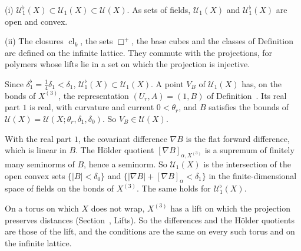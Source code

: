 \begin{detail}\label{d11b:gl-flatconf}
(i) $\mathcal U^\flat_1(X)\subset\mathcal U_1(X)\subset\mathcal U(X)$. As sets of fields, $\mathcal U_1(X)$ and $\mathcal U^\flat_1(X)$ are open and convex.

(ii) The closures $\operatorname{cl}_k$, the sets $\Box^+$, the base cubes and the classes of Definition~ are defined on the infinite lattice. They commute with the projections, for polymers whose lifts lie in a set on which the projection is injective.
\end{detail}

\begin{step}
Since $\delta_1^\flat=\frac14\delta_1<\delta_1$, $\mathcal U^\flat_1(X)\subset\mathcal U_1(X)$. A point $V_B$ of $\mathcal U_1(X)$ has, on the bonds of $X^{(3)}$, the representation $(U_r,A)=(1,B)$ of Definition~. Its real part $1$ is real, with curvature and current $0<\theta_r$, and $B$ satisfies the bounds of $\mathcal U(X)=\mathcal U(X;\theta_r,\delta_1,\delta_0)$. So $V_B\in\mathcal U(X)$.

With the real part $1$, the covariant difference $\nabla B$ is the flat forward difference, which is linear in $B$. The Hölder quotient $[\nabla B]_{\alpha,X^{(3)}}$ is a supremum of finitely many seminorms of $B$, hence a seminorm. So $\mathcal U_1(X)$ is the intersection of the open convex sets $\{|B|<\delta_0\}$ and $\{|\nabla B|+[\nabla B]_\alpha<\delta_1\}$ in the finite-dimensional space of fields on the bonds of $X^{(3)}$. The same holds for $\mathcal U^\flat_1(X)$.

On a torus on which $X$ does not wrap, $X^{(3)}$ has a lift on which the projection preserves distances (Section~, Lifts). So the differences and the Hölder quotients are those of the lift, and the conditions are the same on every such torus and on the infinite lattice.
\end{step}

